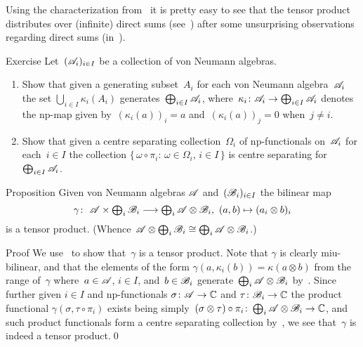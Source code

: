 \documentclass[a]{subfiles}
\begin{document}
\begin{parsec}%
\begin{point}%
Using the characterization from~
it is pretty 
easy to see that the tensor product distributes
over (infinite) direct sums
(see~)
after some unsurprising
observations regarding direct sums
(in~).
\end{point}
\begin{point}{Exercise}%
Let~$(\mathscr{A}_i)_{i\in I}$
be a collection of von Neumann algebras.
\begin{enumerate}
\item
Show that
given a generating subset~$A_i$ 
for each von Neumann algebra~$\mathscr{A}_i$
the set $\bigcup_{i\in I} \kappa_i(A_i)$ 
generates~$\bigoplus_{i\in I} \mathscr{A}_i$,
where~$\kappa_i\colon \mathscr{A}_i\to\bigoplus_{i\in I} \mathscr{A}_i$
denotes
the np-map given by~$(\kappa_i(a))_i=a$ and~$(\kappa_i(a))_j=0$
when~$j\neq i$.
\item
Show that
given a centre separating collection~$\Omega_i$
of np-functionals on~$\mathscr{A}_i$
for each~$i\in I$
the collection $\{\,\omega\circ \pi_i\colon \,
\omega\in\Omega_i,\,i\in I\,\}$
is centre separating for~$\bigoplus_{i\in I}\mathscr{A}_i$.
\end{enumerate}
\end{point}
\begin{point}{Proposition}%
Given von Neumann algebras
$\mathscr{A}$ and~$(\mathscr{B}_i)_{i\in I}$
the bilinear map
\begin{equation*}
	\textstyle
	\gamma\colon 
	\ 
	\scrA \times \bigoplus_i \scrB_i
	\longrightarrow \bigoplus_i \scrA\otimes \scrB_i,\ 
	(a,b)\mapsto (a_i\otimes b)_i
\end{equation*}
is a tensor product.
(Whence~$\mathscr{A}\otimes \bigoplus_i \mathscr{B}_i
\cong \bigoplus_i\mathscr{A}\otimes \mathscr{B}_i$.)
\begin{point}{Proof}%
We use~
to show that~$\gamma$ is a tensor product.
Note that
$\gamma$ is clearly miu-bilinear,
and that
the elements of the form $\gamma(a,\kappa_i(b))
= \kappa(a\otimes b)$
from the range of~$\gamma$
where~$a\in \mathscr{A}$, $i\in I$, and~$b\in\mathscr{B}_i$ 
generate~$\bigoplus_i\mathscr{A} \otimes\mathscr{B}_i$ by~.
Since further 
given $i\in I$ and np-functionals
$\sigma\colon \mathscr{A}\to\mathbb{C}$ and
$\tau\colon \mathscr{B}_i\to\mathbb{C}$
the product functional $\gamma(\sigma,\tau\circ \pi_i)$
exists being simply~$(\sigma\otimes \tau)\circ\pi_i
\colon \bigoplus_i \mathscr{A}\otimes \mathscr{B}_i\to\mathbb{C}$,
and such product functionals form  a centre separating collection 
by~\sref{sum-generation},
we see that~$\gamma$ is indeed a tensor product.\qed
\end{point}
\end{point}
\end{parsec}
\end{document}
